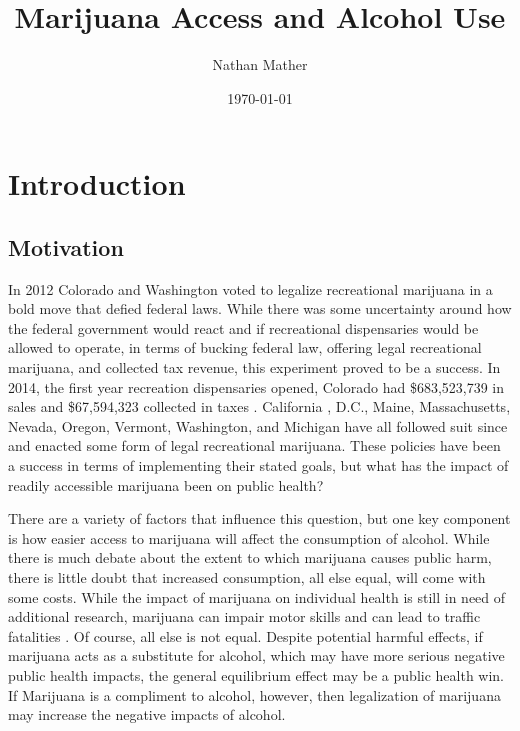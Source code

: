 \documentclass[11pt]{article}
\title{Marijuana Access and Alcohol Use } %
\author{Nathan Mather} %
\date{\today} %
\begin{document}
	
	
\maketitle %

\setcounter{tocdepth}{3} %

\tableofcontents %

\section{Introduction}
\subsection{Motivation}

In 2012 Colorado and Washington voted to legalize recreational marijuana in a bold move that defied federal laws.  While there was some uncertainty around how the federal government would react and if recreational dispensaries would be allowed to operate, in terms of bucking federal law, offering legal recreational marijuana, and collected tax revenue, this experiment proved to be a success. In 2014, the first year recreation dispensaries opened, Colorado had \$683,523,739 in sales and \$67,594,323 collected in taxes \cite{Colorado_marijuana_sales}. California , D.C., Maine, Massachusetts, Nevada, Oregon, Vermont, Washington, and Michigan have all followed suit since and enacted some form of legal recreational marijuana. These policies have been a success in terms of implementing their stated goals, but what has the impact of readily accessible marijuana been on public health? \par

There are a variety of factors that influence this question, but one key component is how easier access to marijuana will affect the consumption of alcohol. While there is much debate about the extent to which marijuana causes public harm, there is little doubt that increased consumption, all else equal, will come with some costs. While the impact of marijuana on individual health is still in need of additional research, marijuana can impair motor skills and can lead to traffic fatalities \cite{webmd_mj}. Of course, all else is not equal.  Despite potential harmful effects, if marijuana acts as a substitute for alcohol, which may have more serious negative public health impacts, the general equilibrium effect may be a public health win. If Marijuana is a compliment to alcohol, however, then legalization of marijuana may increase the negative impacts of alcohol. \par
\end{document}
